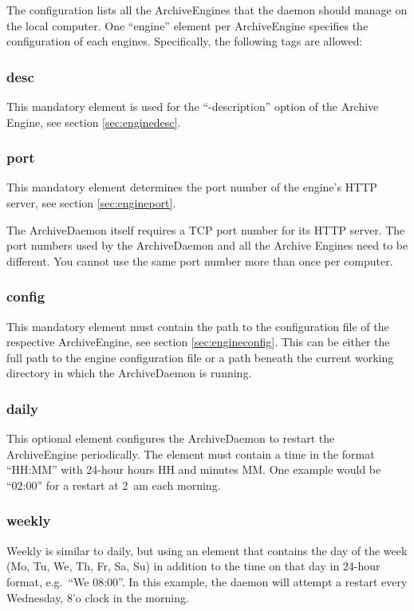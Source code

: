\noindent The configuration lists all the
ArchiveEngines that the daemon should manage on the local
computer. One ``engine'' element per ArchiveEngine specifies the
configuration of each engines. Specifically, the following tags are
allowed:

\subsubsection{desc}
This mandatory element is used for the ``-description'' option of the
Archive Engine, see section \ref{sec:enginedesc}.

\subsubsection{port}
This mandatory element determines the port number of the engine's HTTP
server, see section \ref{sec:engineport}.

\NOTE The ArchiveDaemon itself requires a TCP port number for its HTTP
server. The port numbers used by the ArchiveDaemon and all the Archive
Engines need to be different. You cannot use the same port number more
than once per computer.

\subsubsection{config}
This mandatory element must contain the path to the configuration
file of the respective ArchiveEngine, see section \ref{sec:engineconfig}.
This can be either the full path to the engine configuration file or a path
beneath the current working directory in which the ArchiveDaemon is running.

\subsubsection{daily}
This optional element configures the ArchiveDaemon to restart the
ArchiveEngine periodically. The element must contain a time in the
format ``HH:MM'' with 24-hour hours HH and minutes MM. One example
would be ``02:00'' for a restart at 2~am each morning.

\subsubsection{weekly}
Weekly is similar to daily, but using an element that contains the day
of the week (Mo, Tu,  We, Th, Fr, Sa, Su) in addition to the time
on that day in 24-hour format, e.g.\ ``We 08:00''. In this example,
the daemon will attempt a restart every Wednesday, 8'o clock in the morning.

